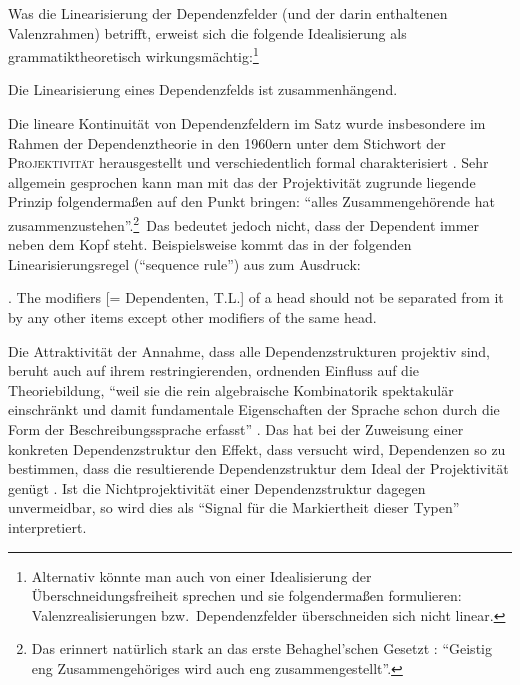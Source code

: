 Was die Linearisierung der Dependenzfelder (und der darin enthaltenen Valenzrahmen) betrifft, erweist sich die folgende Idealisierung als grammatiktheoretisch wirkungsmächtig:\footnote{Alternativ könnte man auch von einer Idealisierung der Überschneidungsfreiheit sprechen und sie folgenderma\ss en formulieren: Valenzrealisierungen bzw.\ Dependenzfelder überschneiden sich nicht linear.}  
\begin{idealisierung} 
Die Linearisierung eines Dependenzfelds ist zusammenhängend.
\end{idealisierung}  
Die lineare Kontinuität von Dependenzfeldern im Satz wurde insbesondere im Rahmen der Dependenztheorie in den 1960ern unter dem Stichwort der \textsc{Projektivität} herausgestellt \citep[73ff]{Dikovsky:Modina:00} und verschiedentlich formal charakterisiert \citep[ 17ff]{Kuhlmann:10}. Sehr allgemein gesprochen kann man mit \citet[51]{Brettschneider:78} das der Projektivität zugrunde liegende Prinzip folgenderma\ss en auf den Punkt bringen: "`alles Zusammengehörende hat zusammenzustehen"'.\footnote{Das erinnert natürlich stark an das erste Behaghel'schen Gesetzt \citep[???]{Behaghel:32}: "`Geistig eng Zusammengehöriges wird auch eng zusammengestellt"'.}\ Das bedeutet jedoch nicht, dass der Dependent immer neben dem Kopf steht. Beispielsweise kommt das in der folgenden Linearisierungsregel ("`sequence rule"') aus \citet{Hudson:80} zum Ausdruck:

\ex. The modifiers [= Dependenten, T.L.] of a head should not be separated from it by any other items except other modifiers of the same head. \citep[(9)]{Hudson:80}
 
Die Attraktivität der Annahme, dass alle Dependenzstrukturen projektiv sind, beruht auch auf ihrem restringierenden, ordnenden Einfluss auf die Theoriebildung, "`weil sie die rein algebraische Kombinatorik spektakulär einschränkt und damit fundamentale Eigenschaften der Sprache schon durch die Form der Beschreibungssprache erfasst"' \cite[250]{Eroms:Heringer:03}. Das hat bei der Zuweisung einer konkreten Dependenzstruktur den Effekt, dass versucht wird, Dependenzen so zu bestimmen, dass die resultierende Dependenzstruktur dem Ideal der Projektivität genügt \citep[251]{Eroms:Heringer:03}. Ist die Nichtprojektivität einer Dependenzstruktur dagegen unvermeidbar, so wird dies als "`Signal für die Markiertheit dieser Typen"' \citep[259]{Eroms:Heringer:03} interpretiert.   

